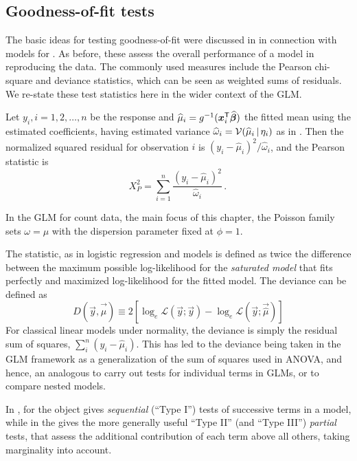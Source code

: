 \documentclass[11pt]{book}\usepackage[]{graphicx}\usepackage[]{color}
\begin{document}
\subsection{Goodness-of-fit tests}\label{sec:glm-goodfit}
The basic ideas for testing goodness-of-fit were discussed in 
in connection with \loglin models for \ctabs.
As before, these assess the overall performance of a model in reproducing the data.
The commonly used measures include the Pearson chi-square and
\LR deviance statistics, which can be seen as weighted sums of residuals.
We re-state these test statistics here in the wider context of the GLM.

Let $y_i, i=1, 2, \dots, n$ be the response and $\widehat{\mu}_i = g^{-1} (\bm{x}_i^\mathsf{T} \widehat{\bm{\beta}})$
the fitted mean using the estimated coefficients, having estimated variance
$\widehat{\omega}_i = \mathcal{V}(\widehat{\mu}_i\, | \, \eta_i)$ as in .
Then the normalized squared residual for observation $i$ is
$(y_i - \widehat{\mu}_i)^2 / \widehat{\omega}_i$, and the Pearson statistic is
\begin{equation}\label{eq:pearson}
X^2_P = \sum_{i=1}^n \frac{(y_i - \widehat{\mu}_i)^2}{\widehat{\omega}_i} \period
\end{equation}

In the GLM for count data, the main focus of this chapter, the Poisson family
sets $\omega = \mu$ with the dispersion parameter fixed at $\phi=1$.

The  statistic, as in logistic regression and \loglin models
is defined as twice the difference between the maximum possible log-likelihood
for the \emph{saturated model} that fits perfectly and maximized log-likelihood
for the fitted model. The deviance can be defined as
\begin{equation*}
D (\vec{y}, \vec{\widehat{\mu}}) \equiv 2 [ \log_e \mathcal{L}(\vec{y};\vec{y}) - \log_e \mathcal{L}(\vec{y};\vec{\widehat{\mu}})]
\end{equation*}
For classical linear models under normality, the deviance is simply the residual sum of squares,
$\sum_i^n (y_i - \widehat{\mu}_i)$.  This has led to the deviance being taken in the GLM
framework as a generalization of the sum of squares used in ANOVA, and hence, an analogous
 to carry out tests for individual terms in GLMs, or to compare
nested models.

In \R,  for the  object 
gives \emph{sequential} (``Type I'') tests of successive terms in a model, while
 in the  gives the more generally useful
``Type II'' (and ``Type III'') \emph{partial} tests, that assess the additional
contribution of each term above all others, taking marginality into account.
\end{document}
